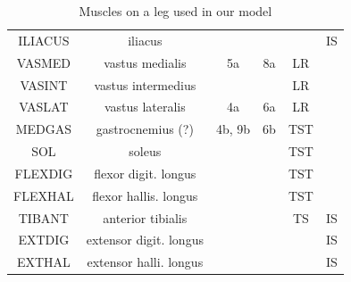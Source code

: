 \documentclass[master,english,final]{kaist-ucs}
\begin{document}
\begin{table}[h!]
\begin{tabular}{cccccc}
  ILIACUS    & iliacus                         &               &              &        & IS\\
  VASMED     & vastus medialis                 &  5a           & 8a           & LR \\
  VASINT     & vastus intermedius              &               &              & LR \\
  VASLAT     & vastus lateralis                &  4a           & 6a           & LR \\
  MEDGAS     & gastrocnemius (?)               &  4b, 9b       & 6b           & TST\\
  SOL        & soleus                          &               &              & TST\\
  FLEXDIG    & flexor digit. longus            &               &              & TST\\
  FLEXHAL    & flexor hallis. longus           &               &              & TST\\
  TIBANT     & anterior tibialis               &               &              & TS      & IS \\
  EXTDIG     & extensor digit. longus          &               &              &         & IS \\
  EXTHAL     & extensor halli. longus          &               &              &         & IS \\
  \hline
\end{tabular}
\caption{Muscles on a leg used in our model}
\label{muslist}
\end{table}
\end{document}

